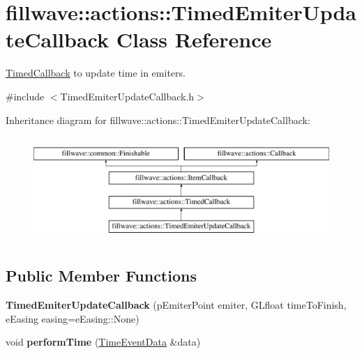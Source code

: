 \hypertarget{classfillwave_1_1actions_1_1TimedEmiterUpdateCallback}{}\section{fillwave\+:\+:actions\+:\+:Timed\+Emiter\+Update\+Callback Class Reference}
\label{classfillwave_1_1actions_1_1TimedEmiterUpdateCallback}


\hyperlink{classfillwave_1_1actions_1_1TimedCallback}{Timed\+Callback} to update time in emiters.  




{\ttfamily \#include $<$Timed\+Emiter\+Update\+Callback.\+h$>$}

Inheritance diagram for fillwave\+:\+:actions\+:\+:Timed\+Emiter\+Update\+Callback\+:\begin{figure}[H]
\begin{center}
\leavevmode
\includegraphics[height=4.000000cm]{classfillwave_1_1actions_1_1TimedEmiterUpdateCallback}
\end{center}
\end{figure}
\subsection*{Public Member Functions}
\begin{DoxyCompactItemize}
\item 
\hypertarget{classfillwave_1_1actions_1_1TimedEmiterUpdateCallback_a5daa4c01d808129202f3eaaa79b0da5b}{}{\bfseries Timed\+Emiter\+Update\+Callback} (p\+Emiter\+Point emiter, G\+Lfloat time\+To\+Finish, e\+Easing easing=e\+Easing\+::\+None)\label{classfillwave_1_1actions_1_1TimedEmiterUpdateCallback_a5daa4c01d808129202f3eaaa79b0da5b}

\item 
\hypertarget{classfillwave_1_1actions_1_1TimedEmiterUpdateCallback_abb52809f03ebbc8c8712713177623590}{}void {\bfseries perform\+Time} (\hyperlink{structfillwave_1_1actions_1_1TimeEventData}{Time\+Event\+Data} \&data)\label{classfillwave_1_1actions_1_1TimedEmiterUpdateCallback_abb52809f03ebbc8c8712713177623590}

\end{DoxyCompactItemize}
